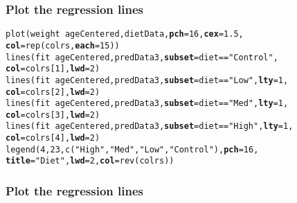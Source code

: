 \documentclass[color=usenames,dvipsnames]{beamer}\usepackage[]{graphicx}\usepackage[]{color}
\makeatletter
\newcommand{\hlnum}[1]{\textcolor[rgb]{0.69,0.494,0}{#1}}%
\newcommand{\hlstr}[1]{\textcolor[rgb]{0.749,0.012,0.012}{#1}}%
\newcommand{\hlopt}[1]{\textcolor[rgb]{0,0,0}{#1}}%
\newcommand{\hlstd}[1]{\textcolor[rgb]{0,0,0}{#1}}%
\newcommand{\hlkwc}[1]{\textcolor[rgb]{0,0,0}{\textbf{#1}}}%
\newcommand{\hlkwd}[1]{\textcolor[rgb]{0.004,0.004,0.506}{#1}}%
\newenvironment{kframe}{%
 \def\at@end@of@kframe{}%
 \ifinner\ifhmode%
  \def\at@end@of@kframe{\end{minipage}}%
  \begin{minipage}{\columnwidth}%
 \fi\fi%
 \def\FrameCommand##1{\hskip\@totalleftmargin \hskip-\fboxsep
 \colorbox{shadecolor}{##1}\hskip-\fboxsep
     \hskip-\linewidth \hskip-\@totalleftmargin \hskip\columnwidth}%
 \MakeFramed {\advance\hsize-\width
   \@totalleftmargin\z@ \linewidth\hsize
   \@setminipage}}%
 {\par\unskip\endMakeFramed%
 \at@end@of@kframe}
\newenvironment{knitrout}{}{} %
\makeatother
\begin{document}
\begin{frame}[fragile]
  \frametitle{Plot the regression lines}
\footnotesize %

\begin{knitrout}\footnotesize
{}\color{fgcolor}\begin{kframe}
\begin{alltt}
\hlkwd{plot}\hlstd{(weight} \hlopt{~} \hlstd{ageCentered, dietData,} \hlkwc{pch}\hlstd{=}\hlnum{16}\hlstd{,} \hlkwc{cex}\hlstd{=}\hlnum{1.5}\hlstd{,}
     \hlkwc{col}\hlstd{=}\hlkwd{rep}\hlstd{(colrs,} \hlkwc{each}\hlstd{=}\hlnum{15}\hlstd{))}
\hlkwd{lines}\hlstd{(fit} \hlopt{~} \hlstd{ageCentered, predData3,} \hlkwc{subset}\hlstd{=diet}\hlopt{==}\hlstr{"Control"}\hlstd{,}
      \hlkwc{col}\hlstd{=colrs[}\hlnum{1}\hlstd{],} \hlkwc{lwd}\hlstd{=}\hlnum{2}\hlstd{)}
\hlkwd{lines}\hlstd{(fit} \hlopt{~} \hlstd{ageCentered, predData3,} \hlkwc{subset}\hlstd{=diet}\hlopt{==}\hlstr{"Low"}\hlstd{,} \hlkwc{lty}\hlstd{=}\hlnum{1}\hlstd{,}
      \hlkwc{col}\hlstd{=colrs[}\hlnum{2}\hlstd{],} \hlkwc{lwd}\hlstd{=}\hlnum{2}\hlstd{)}
\hlkwd{lines}\hlstd{(fit} \hlopt{~} \hlstd{ageCentered, predData3,} \hlkwc{subset}\hlstd{=diet}\hlopt{==}\hlstr{"Med"}\hlstd{,} \hlkwc{lty}\hlstd{=}\hlnum{1}\hlstd{,}
      \hlkwc{col}\hlstd{=colrs[}\hlnum{3}\hlstd{],} \hlkwc{lwd}\hlstd{=}\hlnum{2}\hlstd{)}
\hlkwd{lines}\hlstd{(fit} \hlopt{~} \hlstd{ageCentered, predData3,} \hlkwc{subset}\hlstd{=diet}\hlopt{==}\hlstr{"High"}\hlstd{,} \hlkwc{lty}\hlstd{=}\hlnum{1}\hlstd{,}
      \hlkwc{col}\hlstd{=colrs[}\hlnum{4}\hlstd{],} \hlkwc{lwd}\hlstd{=}\hlnum{2}\hlstd{)}
\hlkwd{legend}\hlstd{(}\hlnum{4}\hlstd{,} \hlnum{23}\hlstd{,} \hlkwd{c}\hlstd{(}\hlstr{"High"}\hlstd{,} \hlstr{"Med"}\hlstd{,} \hlstr{"Low"}\hlstd{,} \hlstr{"Control"}\hlstd{),} \hlkwc{pch}\hlstd{=}\hlnum{16}\hlstd{,}
       \hlkwc{title}\hlstd{=}\hlstr{"Diet"}\hlstd{,} \hlkwc{lwd}\hlstd{=}\hlnum{2}\hlstd{,} \hlkwc{col}\hlstd{=}\hlkwd{rev}\hlstd{(colrs))}
\end{alltt}
\end{kframe}
\end{knitrout}
\end{frame}






\begin{frame}
  \frametitle{Plot the regression lines}
  \vspace{-0.5cm}
  \begin{center}
  \end{center}
\end{frame}
\end{document}
